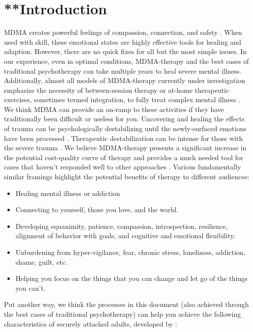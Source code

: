 \documentclass[12pt,letterpaper]{book}
\begin{document}
\section{**Introduction}
MDMA creates powerful feelings of compassion, connection, and safety \cite{fedduciaMDMAMemoryReconsolidation}. When used with skill, these emotional states are highly effective tools for healing and adaption. However, there are no quick fixes for all but the most simple issues. In our experience, even in optimal conditions, MDMA-therapy and the best cases of traditional psychotherapy can take multiple years to heal severe mental illness. Additionally, almost all models of MDMA-therapy currently under investigation emphasize the necessity of between-session therapy or at-home therapeutic exercises, sometimes termed integration, to fully treat complex mental illness \cite{bathje2022Integration}. We think MDMA can provide an on-ramp to these activities if they have traditionally been difficult or useless for you. Uncovering and healing the effects of trauma can be psychologically destabilizing until the newly-surfaced emotions have been processed \cite{olthofDestabilization}. Therapeutic destabilization can be intense for those with the severe trauma \cite{studyingHarms}. We believe MDMA-therapy presents a significant increase in the potential cost-quality curve of therapy and provides a much needed tool for cases that haven't responded well to other approaches \cite{mitchellMDMAClinicalTrial2}. Various fundamentally similar framings highlight the potential benefits of therapy to different audiences:
\begin{itemize}
    \item Healing mental illness or addiction
    \item Connecting to yourself, those you love, and the world.
    \item Developing equanimity, patience, compassion, introspection, resilience, alignment of behavior with goals, and cognitive and emotional flexibility.
    \item Unburdening from hyper-vigilance, fear, chronic stress, loneliness, addiction, shame, guilt, etc.
    \item Helping you focus on the things that you can change and let go of the things you can’t. 
\end{itemize}
Put another way, we think the processes in this document (also achieved through the best cases of traditional psychotherapy) can help you achieve the following characteristics of securely attached adults, developed by \textcite{brownAttachmentDisturbances}:
\end{document}
